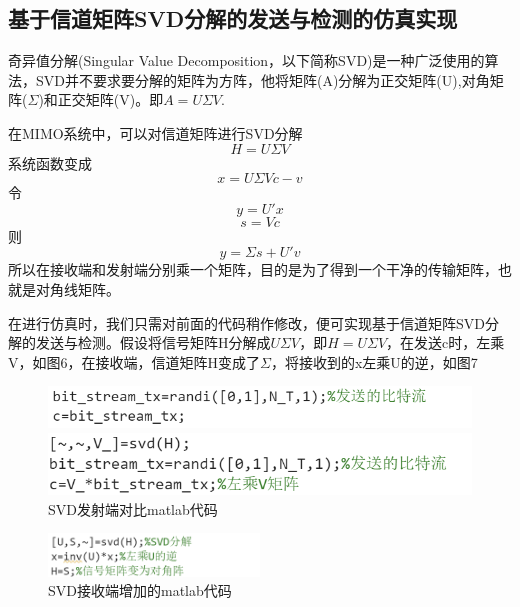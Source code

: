 \documentclass[a4paper,12pt]{article}
\begin{document}
	\subsection{基于信道矩阵SVD分解的发送与检测的仿真实现}
	奇异值分解(Singular Value Decomposition，以下简称SVD)是一种广泛使用的算法，SVD并不要求要分解的矩阵为方阵，他将矩阵(A)分解为正交矩阵(U),对角矩阵($\Sigma$)和正交矩阵(V)。即$A=U\Sigma V$.\par 
	在MIMO系统中，可以对信道矩阵进行SVD分解
	$$H=U\Sigma V$$
	系统函数变成$$x=U\Sigma Vc-v$$
	令$$y=U'x$$
	$$s=Vc$$
	则$$y=\Sigma s+U'v$$
	所以在接收端和发射端分别乘一个矩阵，目的是为了得到一个干净的传输矩阵，也就是对角线矩阵。\par 
	在进行仿真时，我们只需对前面的代码稍作修改，便可实现基于信道矩阵SVD分解的发送与检测。假设将信号矩阵H分解成$U\Sigma V$，即$H=U\Sigma V$，在发送c时，左乘V，如图6，在接收端，信道矩阵H变成了$\Sigma$，将接收到的x左乘U的逆，如图7
	\begin{figure}[h]
		\centering
		\begin{minipage}{0.45\textwidth}
			\centering
			\includegraphics[width=\textwidth]{7.png}
		\end{minipage}
		\qquad
		\begin{minipage}{0.45\textwidth}
			\centering
			\includegraphics[width=\textwidth]{8.png}
		\end{minipage}
		\caption{SVD发射端对比matlab代码}
	\end{figure}
	\begin{figure}[h]
		\centering
		\includegraphics[width=0.5\textwidth]{9.png}
		\caption{SVD接收端增加的matlab代码}
	\end{figure}
\end{document}
